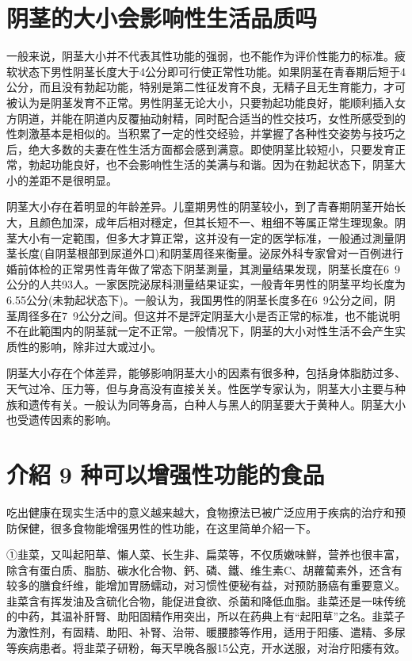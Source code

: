 \documentclass[12pt,UTF8]{ctexbook}
\begin{document}
\section{阴茎的大小会影响性生活品质吗}

一般来说，阴茎大小并不代表其性功能的强弱，也不能作为评价性能力的标准。疲软状态下男性阴茎长度大于4公分即可行使正常性功能。如果阴茎在青春期后短于4公分，而且没有勃起功能，特别是第二性征发育不良，无精子且无生育能力，才可被认为是阴茎发育不正常。男性阴茎无论大小，只要勃起功能良好，能顺利插入女方阴道，并能在阴道内反覆抽动射精，同时配合适当的性交技巧，女性所感受到的性刺激基本是相似的。当积累了一定的性交经验，并掌握了各种性交姿势与技巧之后，绝大多数的夫妻在性生活方面都会感到满意。即使阴茎比较短小，只要发育正常，勃起功能良好，也不会影响性生活的美满与和谐。因为在勃起状态下，阴茎大小的差距不是很明显。

阴茎大小存在着明显的年龄差异。儿童期男性的阴茎较小，到了青春期阴茎开始长大，且颜色加深，成年后相对穩定，但其长短不一、粗细不等属正常生理现象。阴茎大小有一定範围，但多大才算正常，这并没有一定的医学标准，一般通过測量阴茎长度(自阴茎根部到尿道外口)和阴茎周径来衡量。泌尿外科专家曾对一百例进行婚前体检的正常男性青年做了常态下阴茎測量，其測量结果发现，阴茎长度在6~9公分的人共93人。一家医院泌尿科测量结果证实，一般青年男性的阴茎平均长度为6.55公分(未勃起状态下)。一般认为，我国男性的阴茎长度多在6~9公分之间，阴茎周径多在7~9公分之间。但这并不是評定阴茎大小是否正常的标准，也不能说明不在此範围内的阴茎就一定不正常。一般情况下，阴茎的大小对性生活不会产生实质性的影响，除非过大或过小。

阴茎大小存在个体差异，能够影响阴茎大小的因素有很多种，包括身体脂肪过多、天气过冷、压力等，但与身高没有直接关关。性医学专家认为，阴茎大小主要与种族和遗传有关。一般认为同等身高，白种人与黑人的阴茎要大于黄种人。阴茎大小也受遗传因素的影响。

\section{介紹 9 种可以增强性功能的食品}

吃出健康在现实生活中的意义越来越大，食物撩法已被广泛应用于疾病的治疗和预防保健，很多食物能增强男性的性功能，在这里简单介紹一下。

①韭菜，又叫起阳草、懶人菜、长生非、扁菜等，不仅质嫩味鮮，营养也很丰富，除含有蛋白质、脂肪、碳水化合物、鈣、磷、鐵、维生素C、胡蘿蔔素外，还含有较多的膳食纤维，能增加胃肠蠕动，对习惯性便秘有益，对预防肠癌有重要意义。韭菜含有挥发油及含硫化合物，能促进食欲、杀菌和降低血脂。韭菜还是一味传统的中药，其温补肝腎、助阳固精作用突出，所以在药典上有“起阳草”之名。韭菜子为激性剂，有固精、助阳、补腎、治带、暖腰膝等作用，适用于阳痿、遣精、多尿等疾病患者。将韭菜子研粉，每天早晚各服15公克，开水送服，对治疗阳痿有效。
\end{document}

